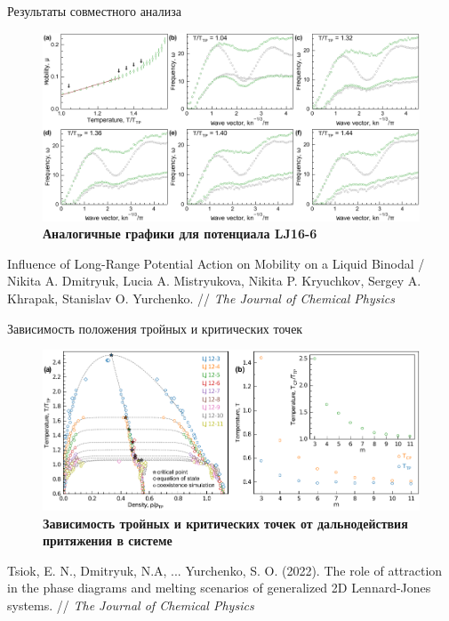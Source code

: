\documentclass{beamer}
\begin{document}
\begin{frame}{Результаты совместного анализа}
\footnotesize{

\begin{figure}
\centering
\includegraphics[width=\textwidth]{MACR-Figure7}
\caption{\footnotesize \textbf{Аналогичные графики для потенциала LJ16-6}}
\label{Figure4}
\end{figure}

}

\tiny{Influence of Long-Range Potential Action on Mobility on a Liquid Binodal / Nikita A. Dmitryuk, Lucia A. Mistryukova, Nikita P. Kryuchkov, Sergey A. Khrapak, Stanislav O. Yurchenko. // \textit{The Journal of Chemical Physics}}
\end{frame}





\begin{frame}{Зависимость положения тройных и критических точек}
\footnotesize{

\begin{figure}
\centering
\includegraphics[width=\textwidth]{NMP-Figure4}
\caption{\footnotesize \textbf{Зависимость тройных и критических точек от дальнодействия притяжения в системе}}
\label{Figure4}
\end{figure}

}

\tiny{Tsiok, E. N., Dmitryuk, N.A, ... Yurchenko, S. O. (2022). The role of attraction in the phase diagrams and melting scenarios of generalized 2D Lennard-Jones systems. // \textit{The Journal of Chemical Physics}}
\end{frame}
\end{document}
